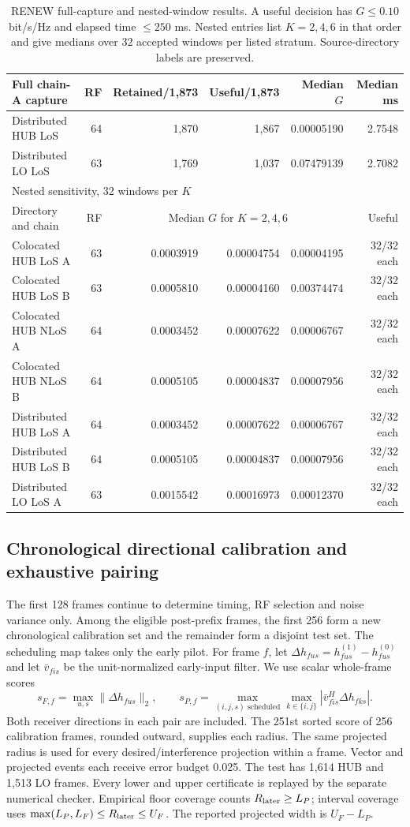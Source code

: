 \documentclass[10pt,letterpaper]{article}
\begin{document}
\begin{table}[htbp]
\centering\small
\caption{RENEW full-capture and nested-window results. A useful decision has
$G\leq0.10$ bit/s/Hz and elapsed time $\leq250$ ms. Nested entries list
$K=2,4,6$ in that order and give medians over 32 accepted windows per listed
stratum. Source-directory labels are preserved.}
\label{supp:table8}
\begin{tabular}{lrrrrr}
\hline
Full chain-A capture & RF & Retained/1,873 & Useful/1,873 & Median $G$ & Median ms\\
\hline
Distributed HUB LoS &64&1,870&1,867&0.00005190&2.7548\\
Distributed LO LoS &63&1,769&1,037&0.07479139&2.7082\\
\hline
\multicolumn{6}{l}{Nested sensitivity, 32 windows per $K$}\\
Directory and chain & RF & \multicolumn{3}{c}{Median $G$ for $K=2,4,6$} & Useful\\
\hline
Colocated HUB LoS A &63&0.0003919&0.00004754&0.00004195&32/32 each\\
Colocated HUB LoS B &63&0.0005810&0.00004160&0.00374474&32/32 each\\
Colocated HUB NLoS A &64&0.0003452&0.00007622&0.00006767&32/32 each\\
Colocated HUB NLoS B &64&0.0005105&0.00004837&0.00007956&32/32 each\\
Distributed HUB LoS A &64&0.0003452&0.00007622&0.00006767&32/32 each\\
Distributed HUB LoS B &64&0.0005105&0.00004837&0.00007956&32/32 each\\
Distributed LO LoS A &63&0.0015542&0.00016973&0.00012370&32/32 each\\
\hline
\end{tabular}
\end{table}
\subsection*{Chronological directional calibration and exhaustive pairing}
The first 128 frames continue to determine timing, RF selection and noise variance only. Among the eligible post-prefix frames, the first 256 form a new chronological calibration set and the remainder form a disjoint test set. The scheduling map takes only the early pilot. For frame $f$, let $\Delta h_{fus}=h^{(1)}_{fus}-h^{(0)}_{fus}$ and let $\bar v_{fis}$ be the unit-normalized early-input filter. We use scalar whole-frame scores
\[
 s_{F,f}=\max_{u,s}\|\Delta h_{fus}\|_2,\qquad
 s_{P,f}=\max_{(i,j,s)\text{ scheduled}}\max_{k\in\{i,j\}}
 |\bar v_{fis}^{H}\Delta h_{fks}|.
\]
Both receiver directions in each pair are included. The 251st sorted score of 256 calibration frames, rounded outward, supplies each radius. The same projected radius is used for every desired/interference projection within a frame. Vector and projected events each receive error budget 0.025. The test has 1,614 HUB and 1,513 LO frames. Every lower and upper certificate is replayed by the separate numerical checker. Empirical floor coverage counts $R_{\rm later}\geq L_P$; interval coverage uses $\max(L_P,L_F)\leq R_{\rm later}\leq U_F$. The reported projected width is $U_F-L_P$.
\end{document}
